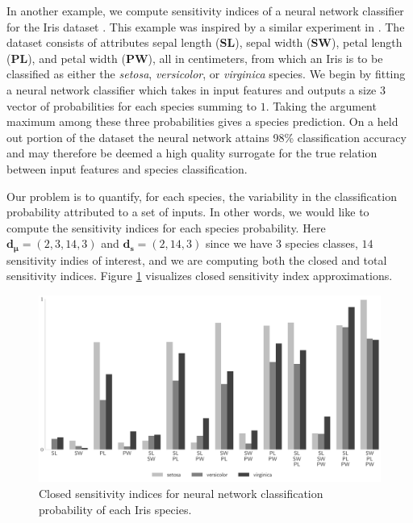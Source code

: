\documentclass[graybox]{svmult}
\begin{document}
In another example, we compute sensitivity indices of a neural network classifier \cite{he2015delving} for the Iris dataset \cite{uci_ml_repo}. This example was inspired by a similar experiment in \cite{hoyt2021efficient}. The dataset consists of attributes sepal length (\textbf{SL}), sepal width (\textbf{SW}), petal length (\textbf{PL}), and petal width (\textbf{PW}), all in centimeters, from which an Iris is to be classified as either the \emph{setosa}, \emph{versicolor}, or \emph{virginica} species. We begin by fitting a neural network classifier which takes in input features and outputs a size $3$ vector of probabilities for each species summing to $1$. Taking the argument maximum among these three probabilities gives a species prediction. On a held out portion of the dataset the neural network attains 98\% classification accuracy and may therefore be deemed a high quality surrogate for the true relation between input features and species classification. 

Our problem is to quantify, for each species, the variability in the classification probability attributed to a set of inputs. In other words, we would like to compute the sensitivity indices for each species probability. 
Here $\boldsymbol{d}_{\boldsymbol{\mu}} = (2,3,14,3)$ and $\boldsymbol{d}_{\boldsymbol{s}} = (2,14,3)$ since we have $3$ species classes, $14$ sensitivity indies of interest, and we are computing both the closed and total sensitivity indices. Figure \ref{SoRa_fig:nn_si} visualizes closed sensitivity index approximations. 
%

\begin{figure}[t]
    \centering
    \includegraphics[width=.8\textwidth]{figs/nn_si.pdf}
    \caption{Closed sensitivity indices for neural network classification probability of each Iris species.}
    \label{SoRa_fig:nn_si}
\end{figure}
\end{document}
